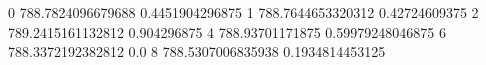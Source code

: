 0 788.7824096679688 0.4451904296875
1 788.7644653320312 0.42724609375
2 789.2415161132812 0.904296875
4 788.93701171875 0.59979248046875
6 788.3372192382812 0.0
8 788.5307006835938 0.1934814453125
